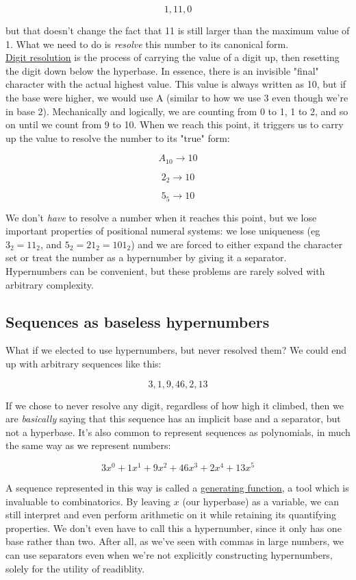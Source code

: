 \documentclass{article}
\begin{document}
$$1,11,0$$

\noindent but that doesn't change the fact that 11 is still larger than the maximum value of 1. What we need to do is \textit{resolve} this number to its canonical form.\\

\noindent \underline{Digit resolution} is the process of carrying the value of a digit up, then resetting the digit down below the hyperbase. In essence, there is an invisible "final" character with the actual highest value. This value is always written as 10, but if the base were higher, we would use A (similar to how we use 3 even though we're in base 2). Mechanically and logically, we are counting from 0 to 1, 1 to 2, and so on until we count from 9 to 10. When we reach this point, it triggers us to carry up the value to resolve the number to its "true" form:

$$A_{10} \rightarrow 10$$

$$2_2 \rightarrow 10$$

$$5_5 \rightarrow 10$$

\noindent We don't \textit{have} to resolve a number when it reaches this point, but we lose important properties of positional numeral systems: we lose uniqueness (eg $3_2 = 11_2$, and $5_2 = 21_2 = 101_2$) and we are forced to either expand the character set or treat the number as a hypernumber by giving it a separator. Hypernumbers can be convenient, but these problems are rarely solved with arbitrary complexity.

\subsection*{Sequences as baseless hypernumbers}

What if we elected to use hypernumbers, but never resolved them? We could end up with arbitrary sequences like this:

$$3, 1, 9, 46, 2, 13$$

\noindent If we chose to never resolve any digit, regardless of how high it climbed, then we are \textit{basically} saying that this sequence has an implicit base and a separator, but not a hyperbase. It's also common to represent sequences as polynomials, in much the same way as we represent numbers:

$$3x^0 + 1x^1 + 9x^2 + 46x^3 + 2x^4 + 13x^5$$

\noindent A sequence represented in this way is called a \underline{generating function}, a tool which is invaluable to combinatorics. By leaving $x$ (our hyperbase) as a variable, we can still interpret and even perform arithmetic on it while retaining its quantifying properties. We don't even have to call this a hypernumber, since it only has one base rather than two. After all, as we've seen with commas in large numbers, we can use separators even when we're not explicitly constructing hypernumbers, solely for the utility of readiblity.\\
\end{document}
